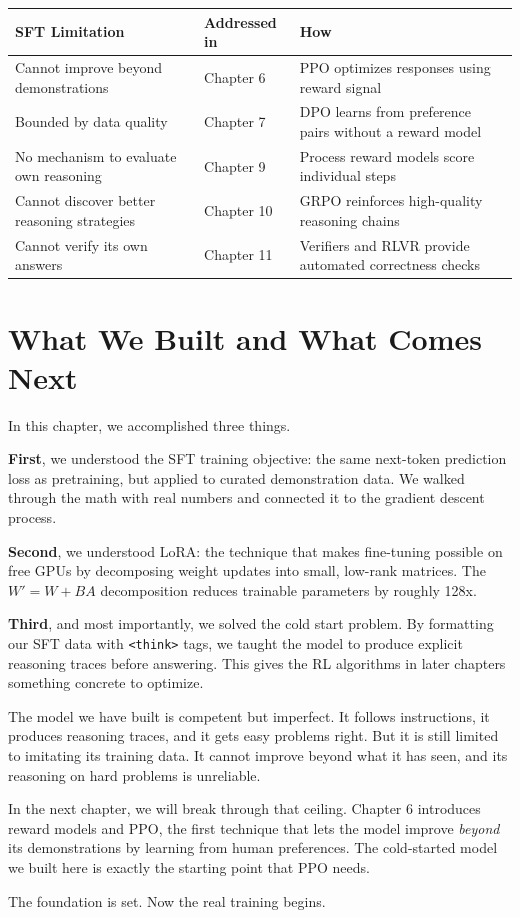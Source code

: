 \begin{chapterenv}
\begin{center}
\begin{tabular}{p{}p{}p{}}
\toprule
\textbf{SFT Limitation} & \textbf{Addressed in} & \textbf{How} \\
\midrule
Cannot improve beyond demonstrations & Chapter 6 & PPO optimizes responses using reward signal \\
Bounded by data quality & Chapter 7 & DPO learns from preference pairs without a reward model \\
No mechanism to evaluate own reasoning & Chapter 9 & Process reward models score individual steps \\
Cannot discover better reasoning strategies & Chapter 10 & GRPO reinforces high-quality reasoning chains \\
Cannot verify its own answers & Chapter 11 & Verifiers and RLVR provide automated correctness checks \\
\bottomrule
\end{tabular}
\end{center}

\section{What We Built and What Comes Next}

In this chapter, we accomplished three things.

\textbf{First}, we understood the SFT training objective: the same next-token prediction loss as pretraining, but applied to curated demonstration data. We walked through the math with real numbers and connected it to the gradient descent process.

\textbf{Second}, we understood LoRA: the technique that makes fine-tuning possible on free GPUs by decomposing weight updates into small, low-rank matrices. The $W' = W + BA$ decomposition reduces trainable parameters by roughly 128x.

\textbf{Third}, and most importantly, we solved the cold start problem. By formatting our SFT data with \texttt{<think>} tags, we taught the model to produce explicit reasoning traces before answering. This gives the RL algorithms in later chapters something concrete to optimize.

The model we have built is competent but imperfect. It follows instructions, it produces reasoning traces, and it gets easy problems right. But it is still limited to imitating its training data. It cannot improve beyond what it has seen, and its reasoning on hard problems is unreliable.

In the next chapter, we will break through that ceiling. Chapter 6 introduces reward models and PPO, the first technique that lets the model improve \textit{beyond} its demonstrations by learning from human preferences. The cold-started model we built here is exactly the starting point that PPO needs.

The foundation is set. Now the real training begins.

\end{chapterenv}